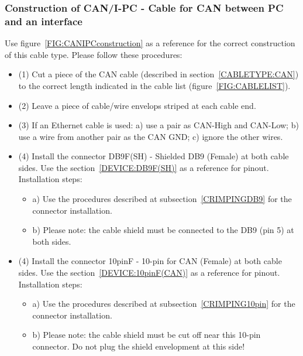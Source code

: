 \subsubsection{Construction of CAN/I-PC - Cable for CAN between PC and an interface} \label{CONSTRUCTION:CANIPC}
Use figure~\ref{FIG:CANIPCconstruction} as a reference for the correct construction of this cable type. Please follow these procedures:
\begin{itemize}
  \item (1) Cut a piece of the CAN cable (described in section~\ref{CABLETYPE:CAN}) to the correct length indicated in the cable list (figure~\ref{FIG:CABLELIST}).
  \item (2) Leave a piece of cable/wire envelops striped at each cable end.
  \item (3) If an Ethernet cable is used: a) use a pair as CAN-High and CAN-Low; b) use a wire from another pair as the CAN GND; c) ignore the other wires.
  \item (4) Install the connector DB9F(SH) - Shielded DB9 (Female) at both cable sides. Use the section~\ref{DEVICE:DB9F(SH)} as a reference for pinout. Installation steps:
  \begin{itemize}
    \item a) Use the procedures described at subsection~\ref{CRIMPINGDB9} for the connector installation.
    \item b) Please note: the cable shield must be connected to the DB9 (pin 5) at both sides.
  \end{itemize}
  \item (4) Install the connector 10pinF - 10-pin for CAN (Female) at both cable sides. Use the section~\ref{DEVICE:10pinF(CAN)} as a reference for pinout. Installation steps:
  \begin{itemize}
    \item a) Use the procedures described at subsection~\ref{CRIMPING10pin} for the connector installation.
    \item b) Please note: the cable shield must be cut off near this 10-pin connector. Do not plug the shield envelopment at this side!
  \end{itemize}
\end{itemize}
